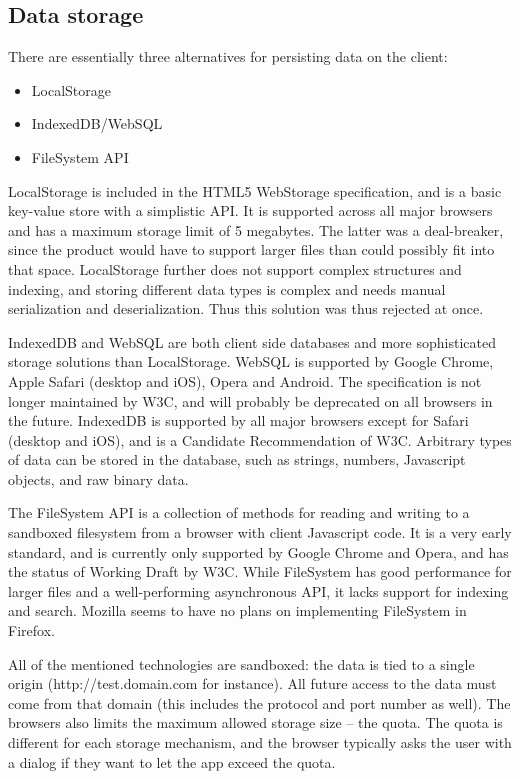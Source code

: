 \subsection{Data storage}

There are essentially three alternatives for persisting data on the client:

\begin{itemize}
\item LocalStorage
\item IndexedDB/WebSQL
\item FileSystem API
\end{itemize}

LocalStorage is included in the HTML5 WebStorage specification, and is a basic key-value store with a simplistic API. It is supported across all major browsers and has a maximum storage limit of 5 megabytes. The latter was a deal-breaker, since the product would have to support larger files than could possibly fit into that space. LocalStorage further does not support complex structures and indexing, and storing different data types is complex and needs manual serialization and deserialization. Thus this solution was thus rejected at once.

IndexedDB and WebSQL are both client side databases and more sophisticated storage solutions than LocalStorage. WebSQL is supported by Google Chrome, Apple Safari (desktop and iOS), Opera and Android. The specification is not longer maintained by W3C, and will probably be deprecated on all browsers in the future. IndexedDB is supported by all major browsers except for Safari (desktop and iOS), and is a Candidate Recommendation of W3C. Arbitrary types of data can be stored in the database, such as strings, numbers, Javascript objects, and raw binary data.

The FileSystem API is a collection of methods for reading and writing to a sandboxed filesystem from a browser with client Javascript code. It is a very early standard, and is currently only supported by Google Chrome and Opera, and has the status of Working Draft by W3C. While FileSystem has good performance for larger files and a well-performing asynchronous API, it lacks support for indexing and search. Mozilla seems to have no plans on implementing FileSystem in Firefox.

All of the mentioned technologies are sandboxed: the data is tied to a single origin (http://test.domain.com for instance). All future access to the data must come from that domain (this includes the protocol and port number as well). The browsers also limits the maximum allowed storage size – the quota. The quota is different for each storage mechanism, and the browser typically asks the user with a dialog if they want to let the app exceed the quota.

